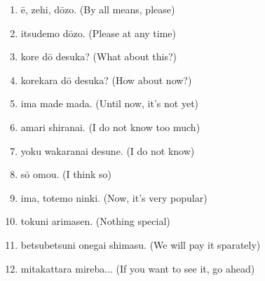 \documentclass[uplatex,dvipdfmx,b5paper,english,10pt]{jsbook}
\begin{document}
\begin{enumerate}
 \item \=e, zehi, d\=ozo. (By all means, please)%
 \item itsudemo d\=ozo. (Please at any time)%
 \item kore d\=o desuka? (What about this?)%
 \item korekara d\=o desuka? (How about now?)%
 \item ima made mada. (Until now, it's not yet)%

 \item amari shiranai. (I do not know too much)%
 \item yoku wakaranai desune. (I do not know)%
 \item s\=o omou. (I think so)%
 \item ima, totemo ninki. (Now, it's very popular)%
 \item tokuni arimasen. (Nothing special)%

 \item betsubetsuni onegai shimasu. (We will pay it sparately)%

 \item mitakattara mireba... (If you want to see it, go ahead)


\end{enumerate}
\end{document}
